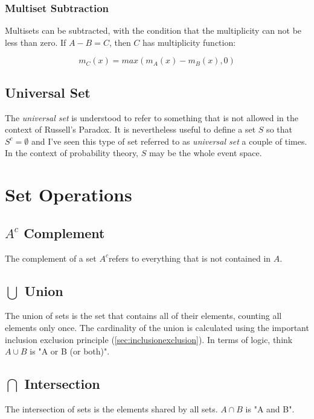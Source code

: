 \subsubsection{Multiset Subtraction}
Multisets can be subtracted, with the condition that the multiplicity can not be less than zero. If $A- B = C$, then $C$ has multiplicity function:

\begin{equation}
m_C(x) = max\left(m_A(x) - m_B(x), 0\right)
\end{equation}




\subsection{Universal Set}
The \textit{universal set} is understood to refer to something that is not allowed in the context of Russell's Paradox. It is nevertheless useful to define a set $S$ so that $S^c = \emptyset$ and I've seen this type of set referred to as \textit{universal set} a couple of times. In the context of probability theory, $S$ may be the whole event space.


\section{Set Operations}

\subsection{$A^c$ Complement}
The complement of a set $A^c$refers to everything that is not contained in $A$. 


\subsection{$\bigcup$ Union}
The union of sets is the set that contains all of their elements, counting all elements only once. The cardinality of the union is calculated using the important inclusion exclusion principle (\ref{sec:inclusionexclusion}). In terms of logic, think $A\cup B$ is "A or B (or both)".

\subsection{$\bigcap$ Intersection}
The intersection of sets is the elements shared by all sets. $A\cap B$ is "A and B".

